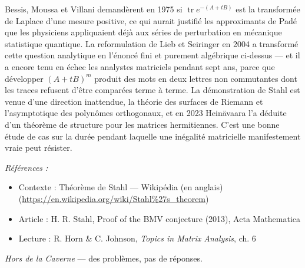 \documentclass[11pt]{article}
\newenvironment{refs}{\par\small\noindent\emph{Références :}\begin{itemize}\setlength\itemsep{0pt}}{\end{itemize}\normalsize}
\begin{document}
\noindent Bessis, Moussa et Villani demandèrent en 1975 si
$\operatorname{tr} e^{-(A + tB)}$ est la transformée de Laplace d'une mesure positive, ce qui aurait
justifié les approximants de Padé que les physiciens appliquaient déjà aux séries de perturbation en
mécanique statistique quantique. La reformulation de Lieb et Seiringer en 2004 a transformé cette
question analytique en l'énoncé fini et purement algébrique ci-dessus --- et il a encore tenu en échec
les analystes matriciels pendant sept ans, parce que développer $(A + tB)^m$ produit des mots en deux
lettres non commutantes dont les traces refusent d'être comparées terme à terme. La démonstration de
Stahl est venue d'une direction inattendue, la théorie des surfaces de Riemann et l'asymptotique des
polynômes orthogonaux, et en 2023 Heinävaara l'a déduite d'un théorème de structure pour les matrices
hermitiennes. C'est une bonne étude de cas sur la durée pendant laquelle une inégalité matricielle
\og{} manifestement vraie \fg{} peut résister.

\begin{refs}
\item Contexte : Théorème de Stahl --- Wikipédia (en anglais) (\url{https://en.wikipedia.org/wiki/Stahl%27s_theorem})
\item Article : H. R. Stahl, \og{} Proof of the BMV conjecture \fg{} (2013), Acta Mathematica
\item Lecture : R. Horn \& C. Johnson, \textit{Topics in Matrix Analysis}, ch. 6
\end{refs}

\bigskip


\vfill
\noindent\emph{Hors de la Caverne} --- des probl\`emes, pas de r\'eponses.
\end{document}
